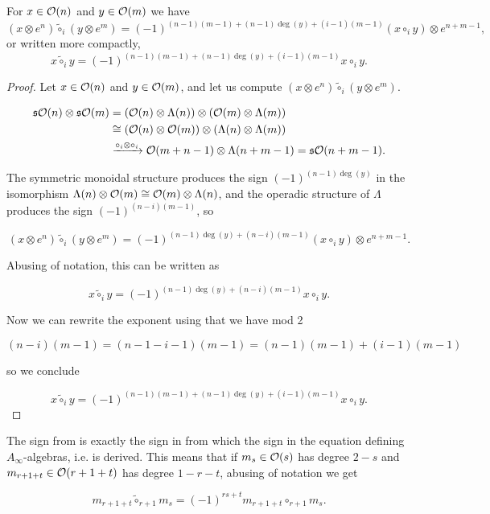 \documentclass[Thesis.tex]{subfiles}
\begin{document}
\begin{lem}\label{tilde}
For $x\in{\mathcal O}(n)$ and $y\in{\mathcal O}(m)$ we have
\[(x\otimes e^n)\tilde{\circ}_i(y\otimes e^m)=(-1)^{(n-1)(m-1)+(n-1)\deg(y)+(i-1)(m-1)}(x\circ_i y)\otimes e^{n+m-1},\]
or written more compactly,
\begin{equation}\label{tildecircle}
x\tilde{\circ}_iy=(-1)^{(n-1)(m-1)+(n-1)\deg(y)+(i-1)(m-1)}x\circ_i y.
\end{equation}
\end{lem}
\begin{proof}
Let $x\in{\mathcal O}(n)$ and $y\in{\mathcal O}(m)$, and let us compute $(x\otimes e^n)\tilde{\circ}_i (y\otimes e^m)$.%

\begin{align*}
\mathfrak{s}{\mathcal O}(n)\otimes\mathfrak{s}{\mathcal O}(m)&=({\mathcal O}(n)\otimes\Lambda(n))\otimes ({\mathcal O}(m)\otimes\Lambda(m))\\
&\cong ({\mathcal O}(n)\otimes {\mathcal O}(m))\otimes (\Lambda(n)\otimes \Lambda(m))\\
&\xrightarrow{\circ_i\otimes\circ_i} {\mathcal O}(m+n-1)\otimes \Lambda(n+m-1)=\mathfrak{s}{\mathcal O}(n+m-1).
\end{align*}

The symmetric monoidal structure produces the sign $(-1)^{(n-1)\deg(y)}$ in the isomorphism $\Lambda(n)\otimes {\mathcal O}(m)\cong{\mathcal O}(m)\otimes\Lambda(n)$, and the operadic structure of $\Lambda$ produces the sign $(-1)^{(n-i)(m-1)}$, so 

\[(x\otimes e^n)\tilde{\circ}_i(y\otimes e^m)=(-1)^{(n-1)\deg(y)+(n-i)(m-1)}(x\circ_i y)\otimes e^{n+m-1}.\]

Abusing of notation, this can be written as

\[
x\tilde{\circ}_iy=(-1)^{(n-1)\deg(y)+(n-i)(m-1)}x\circ_i y.
\]


Now we can rewrite the exponent using that we have mod 2

\[(n-i)(m-1)=(n-1-i-1)(m-1)=(n-1)(m-1)+(i-1)(m-1)\]

so we conclude 

\[
x\tilde{\circ}_iy=(-1)^{(n-1)(m-1)+(n-1)\deg(y)+(i-1)(m-1)}x\circ_i y.
\]
\end{proof}

\begin{remark}
The sign from  is exactly the sign in \cite[\S 1.2]{RW} from which the sign in the equation defining $A_\infty$-algebras, i.e.  is derived. This means that if $m_s\in{\mathcal O}(s)$ has degree $2-s$ and $m_{r+1+t}\in {\mathcal O}(r+1+t)$ has degree $1-r-t$, abusing of notation we get

\[m_{r+1+t}\tilde{\circ}_{r+1}m_s=(-1)^{rs+t}m_{r+1+t}\circ_{r+1}m_s.\]
\end{remark}
\end{document}
